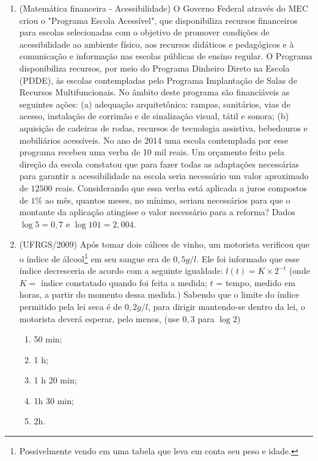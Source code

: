 \begin{enumerate}
\item{} \label{matemfinan}

(Matemática financeira - Acessibilidade) O Governo Federal através do MEC criou o "Programa Escola Acessível", que disponibiliza recursos financeiros para escolas selecionadas com o objetivo de promover condições de acessibilidade ao ambiente físico, aos recursos didáticos e pedagógicos e à comunicação e informação nas escolas públicas de ensino regular. O Programa disponibiliza recursos, por meio do Programa Dinheiro Direto na Escola (PDDE), às escolas contempladas pelo Programa Implantação de Salas de Recursos Multifuncionais. No âmbito deste programa são financiáveis as seguintes ações: (a) adequação arquitetônica: rampas, sanitários, vias de acesso, instalação de corrimão e de sinalização visual, tátil e sonora; (b) aquisição de cadeiras de rodas, recursos de tecnologia assistiva, bebedouros e mobiliários acessíveis. No ano de 2014 uma escola contemplada por esse programa recebeu uma verba de 10 mil reais. Um orçamento feito pela direção da escola constatou que para fazer todas as adaptações necessárias para garantir a acessibilidade na escola seria necessário um valor aproximado de $12500$ reais. Considerando que essa verba está aplicada a juros compostos de $1\%$ ao mês, quantos meses, no mínimo, seriam necessários para que o montante da aplicação atingisse o valor necessário para a reforma? Dados $\log 5 = 0{,}7$ e $\log 101 = 2{,}004$.

\item{} \label{UFRGS2009} 

(UFRGS/2009) Após tomar dois cálices de vinho, um motorista verificou que o índice de álcool\footnote{Possivelmente vendo em uma tabela que leva em conta seu peso e idade.} em seu sangue era de $0{,}5g/l$. Ele foi informado que esse índice decresceria de acordo com a seguinte igualdade: $l(t) = K\times 2^{-t}$  (onde $K =$  índice constatado quando foi feita a medida; $t$ = tempo, medido em horas, a partir do momento dessa medida.) Sabendo que o limite do índice permitido pela lei seca é de $0{,}2g/l$, para dirigir mantendo-se dentro da lei, o motorista deverá esperar, pelo menos, (use $0{,}3$ para $\log 2$)
\begin{enumerate}
\item 50 min;
\item 1 h;	
\item 1 h 20 min;	
\item 1h 30 min;
\item 2h.
\end{enumerate}
\end{enumerate}

